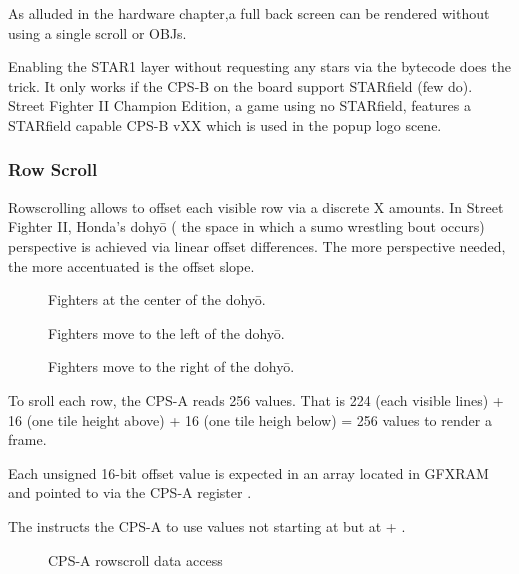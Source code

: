 As alluded in the hardware chapter,a  full back screen can be rendered without using a single scroll or OBJs.

Enabling the STAR1 layer without requesting any stars via the bytecode does the trick. It only works if the CPS-B on the board support STARfield (few do). Street Fighter II Champion Edition, a game using no STARfield, features a STARfield capable CPS-B vXX which is used in the popup logo scene.

\pagebreak


\subsubsection{Row Scroll}
Rowscrolling allows to offset each visible row via a discrete X amounts. In Street Fighter II, Honda's dohyō ( the space in which a sumo wrestling bout occurs) perspective is achieved via linear offset differences. The more perspective needed, the more accentuated is the offset slope. 

\begin{figure}[H]
\caption*{Fighters at the center of the dohyō.}
 \end{figure}%

\begin{figure}[H]
\caption*{Fighters move to the left of the dohyō.}
 \end{figure}%

\begin{figure}[H]
\caption*{Fighters move to the right of the dohyō.}
 \end{figure}%

To sroll each row, the CPS-A reads 256 values. That is 224 (each visible lines) + 16 (one tile height above) + 16 (one tile heigh below) = 256 values to render a frame.

Each unsigned 16-bit offset value is expected in an array located in GFXRAM and pointed to via the CPS-A register .

The  instructs the CPS-A to use values not starting at  but at  + . 

\begin{figure}[H]
 \caption*{CPS-A rowscroll data access}%
 \end{figure}%


